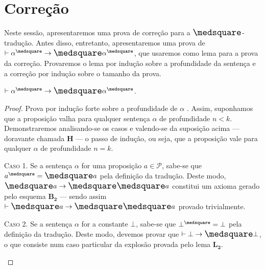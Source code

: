 \section{Correção}

    Neste sessão, apresentaremos uma prova de correção para a $\nec$-tradução. Antes disso, entretanto, apresentaremos uma prova de $\entails\alpha^\medsquare\to\nec\alpha^\medsquare$, que usaremos como lema para a prova da correção. Provaremos o lema por indução sobre a profundidade da sentença e a correção por indução sobre o tamanho da prova.

    \begin{lemma}\label{square-nec}
        $\entails\alpha^\medsquare\to\nec\alpha^\medsquare$.

        \begin{proof}
            Prova por indução forte sobre a profundidade de $\alpha$ \citep{Troelstra}.
            Assim, suponhamos que a proposição valha para qualquer sentença $\alpha$ de profundidade $n<k$.
            Demonstraremos analisando-se os casos e valendo-se da suposição acima --- doravante chamada $\mathbf{H}$ --- o passo de indução, ou seja, que a proposição vale para qualquer $\alpha$ de profundidade $n=k$.

            \begin{case}
                \textsc{Caso 1.}
                Se a sentença $\alpha$ for uma proposição $a\in\mathcal{P}$, sabe-se que $a^\medsquare=\nec a$ pela definição da tradução.
                Deste modo, $\nec{a}\to\nec\nec{a}$ constitui um axioma gerado pelo esquema \hyperref[MB2]{$\mathbf{B_2}$} --- sendo assim $\entails\nec{a}\to\nec\nec{a}$ provado trivialmente.
            \end{case}

            \begin{case}
                \textsc{Caso 2.}
                Se a sentença $\alpha$ for a constante $\bot$, sabe-se que $\bot^\medsquare=\bot$ pela definição da tradução.
                Deste modo, devemos provar que $\entails\bot\to\nec\bot$, o que consiste num caso particular da explosão provada pelo lema \hyperref[explosion]{$\mathbf{L_2}$}.
            \end{case}


\end{proof}
\end{lemma}
